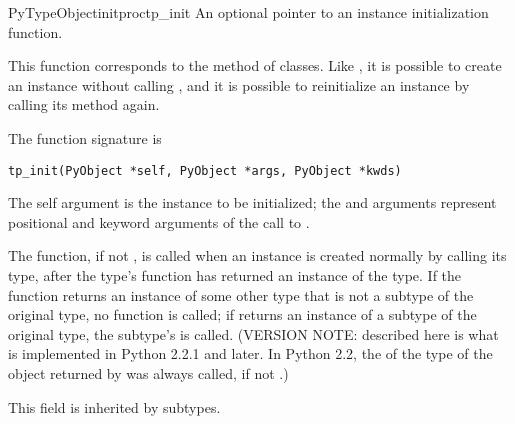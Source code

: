 \begin{cmemberdesc}{PyTypeObject}{initproc}{tp_init}
  An optional pointer to an instance initialization function.

  This function corresponds to the  method of
  classes.  Like , it is possible to create an
  instance without calling , and it is possible to
  reinitialize an instance by calling its  method
  again.

  The function signature is

\begin{verbatim}
tp_init(PyObject *self, PyObject *args, PyObject *kwds)
\end{verbatim}

  The self argument is the instance to be initialized; the 
  and  arguments represent positional and keyword arguments
  of the call to .

  The  function, if not \NULL, is called when an
  instance is created normally by calling its type, after the type's
   function has returned an instance of the type.  If
  the  function returns an instance of some other type
  that is not a subtype of the original type, no 
  function is called; if  returns an instance of a
  subtype of the original type, the subtype's  is
  called.  (VERSION NOTE: described here is what is implemented in
  Python 2.2.1 and later.  In Python 2.2, the  of the
  type of the object returned by  was always called, if
  not \NULL.)

  This field is inherited by subtypes.
\end{cmemberdesc}

